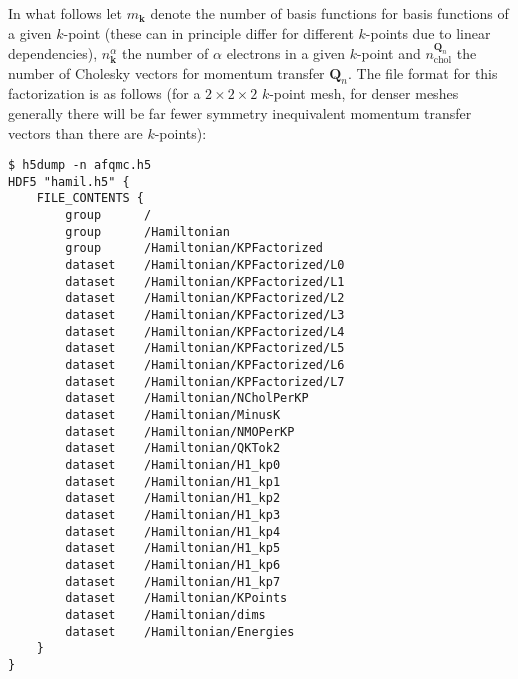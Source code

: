 In what follows let $m_{\mathbf{k}}$ denote the number of basis functions for basis functions of a given $k$-point (these can in principle differ for different $k$-points due to linear dependencies), $n^{\alpha}_{\mathbf{k}}$ the number of $\alpha$ electrons in a given $k$-point and $n_{\mathrm{chol}}^{\mathbf{Q}_n}$ the number of Cholesky vectors for momentum transfer $\mathbf{Q}_n$.
The file format for this factorization is as follows (for a $2\times2\times2$ $k$-point mesh, for denser meshes generally there will be far fewer symmetry inequivalent momentum transfer vectors than there are $k$-points):
\begin{lstlisting}[style=SHELL,caption=Sample Dense $k$-point dependent Cholesky QMCPACK Hamtiltonian.]
$ h5dump -n afqmc.h5
HDF5 "hamil.h5" {
    FILE_CONTENTS {
        group      /
        group      /Hamiltonian
        group      /Hamiltonian/KPFactorized
        dataset    /Hamiltonian/KPFactorized/L0
        dataset    /Hamiltonian/KPFactorized/L1
        dataset    /Hamiltonian/KPFactorized/L2
        dataset    /Hamiltonian/KPFactorized/L3
        dataset    /Hamiltonian/KPFactorized/L4
        dataset    /Hamiltonian/KPFactorized/L5
        dataset    /Hamiltonian/KPFactorized/L6
        dataset    /Hamiltonian/KPFactorized/L7
        dataset    /Hamiltonian/NCholPerKP
        dataset    /Hamiltonian/MinusK
        dataset    /Hamiltonian/NMOPerKP
        dataset    /Hamiltonian/QKTok2
        dataset    /Hamiltonian/H1_kp0
        dataset    /Hamiltonian/H1_kp1
        dataset    /Hamiltonian/H1_kp2
        dataset    /Hamiltonian/H1_kp3
        dataset    /Hamiltonian/H1_kp4
        dataset    /Hamiltonian/H1_kp5
        dataset    /Hamiltonian/H1_kp6
        dataset    /Hamiltonian/H1_kp7
        dataset    /Hamiltonian/KPoints
        dataset    /Hamiltonian/dims
        dataset    /Hamiltonian/Energies
    }
}
\end{lstlisting}
